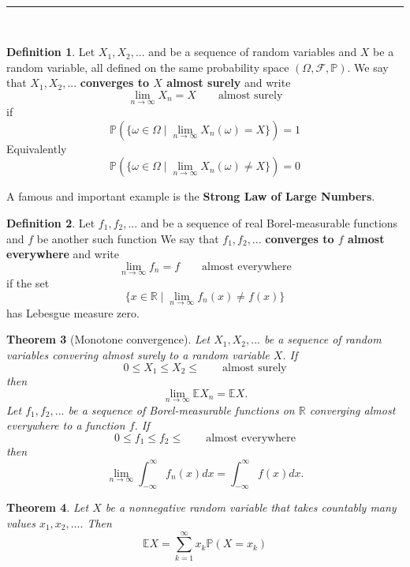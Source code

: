 \documentclass[reqno,a4paper,12pt]{amsart}%
\numberwithin{equation}{section}
\newtheorem{theorem}{Theorem}
\theoremstyle{definition}
\newtheorem{definition}[theorem]{Definition}
\newcommand{\Ee}{{\mathbb{E}}}
\newcommand{\Pp}{{\mathbb{P}}}
\newcommand{\Rr}{{\mathbb{R}}}
\begin{document}
\

\begin{center}
	\par\noindent\rule{200pt}{0.1pt}
\end{center}	
	
\	

\begin{definition}
	Let $X_1, X_2,...$ and be a sequence of random variables and $X$ be a random variable, all defined on the same probability space $(\Omega, \mathcal{F}, \Pp)$.
	We say that $X_1,X_2,...$ \textbf{converges to $X$ almost surely } and write $$\lim_{n \to \infty} X_n= X \quad \quad \textrm{almost surely} $$ if $$\Pp(\{ \omega \in \Omega \mid \lim_{n\to \infty }X_n(\omega)= X \})=1$$
Equivalently $$\Pp(\{ \omega \in \Omega \mid \lim_{n\to \infty }X_n(\omega) \neq  X \})=0$$
\end{definition}

A famous and important example is the \textbf{Strong Law of Large Numbers}.

\begin{definition}
	Let $f_1, f_2,...$ and be a sequence of real Borel-measurable functions and $f$ be another such function
	We say that $f_1,f_2,...$ \textbf{converges to $f$ almost everywhere } and write $$\lim_{n \to \infty} f_n= f \quad \quad \textrm{almost everywhere} $$ if  the set  $$\{ x \in \Rr \mid \lim_{n\to \infty }f_n(x) \neq  f(x) \}$$ has Lebesgue measure zero.
\end{definition}

\begin{theorem}[Monotone convergence]
	Let $X_1,X_2,...$ be a sequence of random variables convering almost surely to a random variable $X$. If $$0 \leq X_1 \leq X_2 \leq  \quad \quad \textrm{almost surely}$$
	then $$\lim_{n\to \infty} \Ee X_n = \Ee X. $$
	Let $f_1,f_2,...$ be a sequence of Borel-measurable functions on $\Rr$ converging almost everywhere to a function $f$. If $$0 \leq f_1 \leq f_2 \leq  \quad \quad \textrm{almost everywhere}$$
	then $$\lim_{n\to \infty}  \int_{-\infty}^{\infty} f_n(x)dx = \int_{-\infty}^{\infty} f(x)dx. $$
	
\end{theorem}


\begin{theorem}
	Let $X$ be a nonnegative random variable that takes countably many values $x_1,x_2,....$ Then $$\Ee X= \sum_{k=1}^{\infty}x_k \Pp({X=x_k})	 $$ 
\end{theorem}
 
\end{document}
